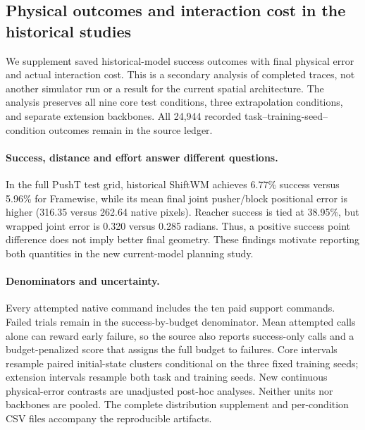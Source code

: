 \subsection{Physical outcomes and interaction cost in the historical studies}
\label{app:historical-physical-metrics}
We supplement saved historical-model success outcomes with final physical error
and actual interaction cost. This is a secondary analysis of completed traces,
not another simulator run or a result for the current spatial architecture.
The analysis preserves all nine core test conditions, three extrapolation
conditions, and separate extension backbones. All 24,944 recorded
task--training-seed--condition outcomes remain in the source ledger.

\paragraph{Success, distance and effort answer different questions.}
In the full PushT test grid, historical ShiftWM achieves 6.77\% success versus
5.96\% for Framewise, while its mean final joint pusher/block positional error is
higher (316.35 versus 262.64 native pixels). Reacher success is tied at 38.95\%,
but wrapped joint error is 0.320 versus 0.285 radians. Thus, a positive success
point difference does not imply better final geometry. These findings motivate
reporting both quantities in the new current-model planning study.



\paragraph{Denominators and uncertainty.}
Every attempted native command includes the ten paid support commands. Failed
trials remain in the success-by-budget denominator. Mean attempted calls alone
can reward early failure, so the source also reports success-only calls and a
budget-penalized score that assigns the full budget to failures. Core intervals
resample paired initial-state clusters conditional on the three fixed training
seeds; extension intervals resample both task and training seeds. New continuous
physical-error contrasts are unadjusted post-hoc analyses. Neither units nor
backbones are pooled. The complete distribution supplement and per-condition
CSV files accompany the reproducible artifacts.


